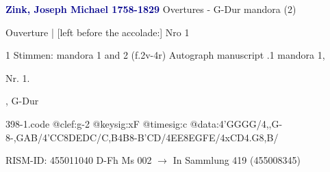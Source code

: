 \documentclass[twocolumn]{book}
\begin{document}
\newline \par \vspace{7pt} \textcolor{darkblue}{\textbf{Zink, Joseph Michael  1758-1829}}
\newline Overtures - G-Dur
\newline mandora (2)
\newline \begin{itshape} Ouverture | [left before the accolade:] Nro 1\end{itshape} 
\newline \textcolor{darkblue}{}  1 Stimmen: mandora 1 and 2  (f.2v-4r)
\newline Autograph manuscript
.1  mandora 1, \begin{itshape}Nr. 1.\end{itshape}, G-Dur  
\begin{filecontents*}{398-1.code}
@clef:g-2
@keysig:xF
@timesig:c
@data:4'GGGG/4,,G-8-{,GAB}/4'CC8DEDC/{C,B}4B8-{B'C}D/4EE{8EG}{FE}/4xCD4.G8,B/
\end{filecontents*}
\newline
%
\newline RISM-ID: 455011040
\newline D-Fh  Ms 002
\newline $\rightarrow$ In Sammlung 419 (455008345)
      
\end{document}
